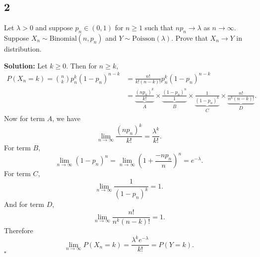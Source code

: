 \documentclass[12pt]{article}
\newcounter{ProofCounter}
\newenvironment{Solution}{\stepcounter{ProofCounter}\textbf{Solution:}}{\hfill$\square$}
\newcommand\toinf{\rightarrow\infty}
\newcommand{\linf}[1]{\lim_{#1\rightarrow\infty}}
\begin{document}
\subsection*{2}
\begin{tcolorbox}
  Let $\lambda > 0$ and suppose $p_n \in (0, 1)$ for $n \geq 1$ such that $np_n \rightarrow \lambda$ as $n\toinf$. Suppose $X_n \sim \text{Binomial}(n, p_n)$ and $Y \sim \text{Poisson}(\lambda)$. Prove that $X_n \rightarrow Y$ in distribution.
\end{tcolorbox}
\begin{Solution}
  Let $k \geq 0$. Then for $n \geq k$,
  \begin{align}
    P(X_n = k) = \binom{n}{k} p_n^k(1 - p_n)^{n-k} & = \frac{n!}{k!(n-k)!} p_n^k(1 - p_n)^{n-k} \nonumber \\
    & = \underbrace{\frac{(np_n)^{k}}{k!}}_{A} \times \underbrace{\frac{(1-p_n)^n}{1}}_{B} \times \underbrace{\frac{1}{(1-p_n)^k}}_{C} \times \underbrace{\frac{n!}{n^k(n-k)!}}_{D}.
    \label{2.1}
  \end{align}
  Now for term $A$, we have
  \begin{equation}
    \lim_{n\rightarrow\infty} \frac{(np_n)^{k}}{k!} = \frac{\lambda^k}{k!}.
    \label{2.2}
  \end{equation}
  For term $B$,
  \begin{equation}
    \linf{n} (1 - p_n)^n = \linf{n} \left( 1 + \frac{-np_n}{n} \right)^n = e^{-\lambda}.
    \label{2.3}
  \end{equation}
  For term $C$,
  \begin{equation}
    \linf{n} \frac{1}{(1 - p_n)^k} = 1.
    \label{2.4}
  \end{equation}
  And for term $D$,
  \begin{equation}
    \linf{n} \frac{n!}{n^k(n-k)!} = 1.
    \label{2.5}
  \end{equation}
  Therefore
  \begin{equation}
    \linf{n} P(X_n = k) = \frac{\lambda^k e^{-\lambda}}{k!} = P(Y = k).
    \label{2.6}
  \end{equation}
\end{Solution}


\newpage
\end{document}
